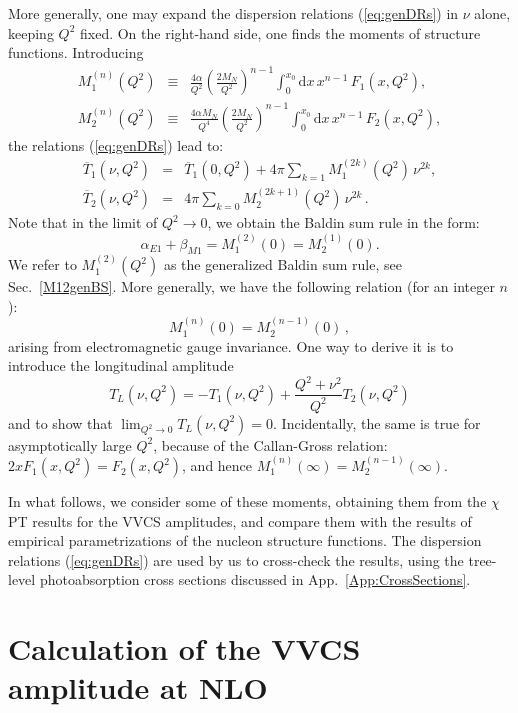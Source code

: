 \documentclass[12pt,preprint,tightenlines,
showpacs,preprintnumbers,amsmath,amssymb,
a4paper,nofootinbib]{revtex4-2}
\def\beq{\begin{equation}}
\def\eeq{\end{equation}}
\def\bea{\begin{eqnarray}}
\def\eea{\end{eqnarray}}
\def\eqlab#1{\label{eq:#1}}
\def\eref#1{(\ref{eq:#1})}
\def\al{\alpha}
\def\dd{\mathrm{d}}
\def\ol#1{\overline{#1}}
\begin{document}
 More generally, one may expand the dispersion relations \eref{genDRs} in $\nu$ alone, keeping $Q^2$ fixed. On the right-hand side, one finds the moments of structure functions. Introducing
 \begin{subequations}
 \bea
  M_1^{(n)}(Q^2) &\equiv &  \frac{4\al}{Q^2} \left(\frac{2M_N}{Q^2}\right)^{n-1} \int_{0}^{x_0} 
\!\dd x \, x^{n-1} \, F_1(x,Q^2), \\
 M_2^{(n)}(Q^2) &\equiv &  \frac{4\al M_N}{Q^4} \left(\frac{2M_N}{Q^2}\right)^{n-1} \int_{0}^{x_0} 
\!\dd x \, x^{n-1} \, F_2(x,Q^2), 
 \eea 
 \end{subequations}
 the relations \eref{genDRs} lead to:
 \begin{subequations}
 \eqlab{VVCSexpansion}
 \bea
 \ol  T_1(\nu,Q^2) &=& \ol T_1(0,Q^2) + 4\pi \sum_{k=1} M_1^{(2k)}(Q^2)\,  \nu^{2k},\\
  \ol T_2(\nu,Q^2) &=&  4\pi \sum_{k=0} M_2^{(2k+1)}(Q^2)\, \nu^{2k}\,.
 \eea 
 \end{subequations}
 Note that in the limit of $Q^2\to 0$, we obtain the Baldin sum rule
 in the form:
 \beq 
 \alpha_{E1} + \beta_{M1} = M_1^{(2)}(0) =M_2^{(1)}(0).
 \eeq 
 We refer to $M_1^{(2)}(Q^2)$ as the generalized Baldin sum rule, see Sec.~\ref{M12genBS}. 
 More generally, we have the following relation (for an integer $n$):
 \beq
 M_1^{(n)}(0) =M_2^{(n-1)}(0)\, ,
 \eeq 
 arising from electromagnetic gauge invariance. One way to derive it
 is to introduce the longitudinal amplitude
 \beq 
 T_L(\nu,Q^2) = -T_1(\nu, Q^2) +\frac{Q^2+\nu^2}{Q^2} T_2(\nu,Q^2)
 \eeq
 and to show that $\lim_{Q^2\to 0} T_L(\nu,Q^2) =0$. Incidentally,
 the same is true for asymptotically large $Q^2$, because of the
 Callan-Gross relation: $2x F_1(x,Q^2) = F_2(x,Q^2)$, and
 hence $M_1^{(n)}(\infty) =M_2^{(n-1)}(\infty)$.
 

 
 In what follows, we consider some of these
 moments, obtaining them from the $\chi$PT results for the VVCS amplitudes, and compare them
 with the results of  empirical parametrizations of the nucleon structure functions.
 The dispersion relations \eref{genDRs} are used by us to cross-check the results, using
 the tree-level photoabsorption cross sections discussed in App.~\ref{App:CrossSections}.
 



\section{Calculation of the VVCS amplitude at NLO} 
\label{Sec:ChEFT_for_VVCS}
\end{document}
